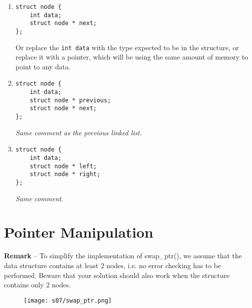 \begin{enumerate}[label={\questioncolor\arabic*.}]
    \item {}

\begin{lstlisting}
struct node {
    int data;
    struct node * next;
};
\end{lstlisting}

    Or replace the \verb!int data! with the type expected to be in the structure, or replace it with a pointer, which will be using the same amount of memory to point to any data.


    \item {}

\begin{lstlisting}
struct node {
    int data;
    struct node * previous;
    struct node * next;
};
\end{lstlisting}

    \textit{Same comment as the previous linked list.}

    \item {}

\begin{lstlisting}
struct node {
    int data;
    struct node * left;
    struct node * right;
};
\end{lstlisting}

    \textit{Same comment}.

\end{enumerate}




%
%
\bigskip
\bigskip
\section{Pointer Manipulation}


{\color{gray} \textbf{Remark} -- To simplify the implementation of swap\_ptr(), we
assume that the data structure contains at least 2 nodes, i.e. no error
checking has to be performed. Beware that your solution should also work
when the structure contains only 2 nodes.}


\begin{figure}[H]
    \center
    \texttt{[image: s07/swap\_ptr.png]}
    \label{fig:fig1}
\end{figure}


